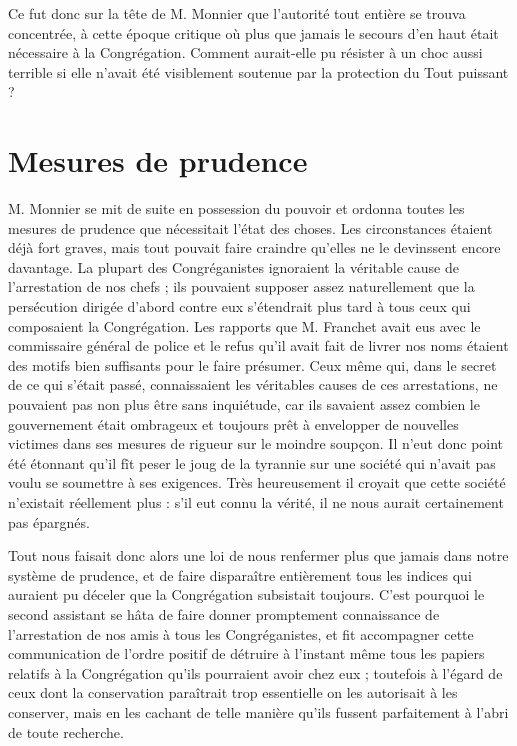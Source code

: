 Ce fut donc sur la tête de M. Monnier que l'autorité tout entière se trouva concentrée, à cette époque critique où plus que jamais le secours d'en haut était nécessaire à la Congrégation. Comment aurait-elle pu résister à un choc aussi terrible si elle n'avait été visiblement soutenue par la protection du Tout puissant ?

\section*{Mesures de prudence}
M. Monnier se mit de suite en possession du pouvoir et ordonna toutes les mesures de prudence que nécessitait l'état des choses. Les circonstances étaient déjà fort graves, mais tout pouvait faire craindre qu'elles ne le devinssent encore davantage. La plupart des Congréganistes ignoraient la véritable cause de l'arrestation de nos chefs ; ils pouvaient supposer assez naturellement que la persécution dirigée d'abord contre eux s'étendrait plus tard à tous ceux qui composaient la Congrégation. Les rapports que M. Franchet avait eus avec le commissaire général de police et le refus qu'il avait fait de livrer nos noms étaient des motifs bien suffisants pour le faire présumer.
Ceux même qui, dans le secret de ce qui s'était passé, connaissaient les véritables causes de ces arrestations, ne pouvaient pas non plus être sans inquiétude, car ils savaient assez combien le gouvernement était ombrageux et toujours prêt à envelopper de nouvelles victimes dans ses mesures de rigueur sur le moindre soupçon. Il n'eut donc point été étonnant qu'il fît peser le joug de la tyrannie sur une société qui n'avait pas voulu se soumettre à ses exigences. Très heureusement il croyait que cette société n'existait réellement plus : s'il eut connu la vérité, il ne nous aurait certainement pas épargnés.

Tout nous faisait donc alors une loi de nous renfermer plus que jamais dans notre système de prudence, et de faire disparaître entièrement tous les indices qui auraient pu déceler que la Congrégation subsistait toujours. C'est pourquoi le second assistant se hâta de faire donner promptement connaissance de l'arrestation de nos amis à tous les Congréganistes, et fit accompagner cette communication de l'ordre positif de détruire à l'instant même tous les papiers relatifs à la Congrégation qu'ils pourraient avoir chez eux ; toutefois à l'égard de ceux dont la conservation paraîtrait trop essentielle on les autorisait à les conserver, mais en les cachant de telle manière qu'ils fussent parfaitement à l'abri de toute recherche.

